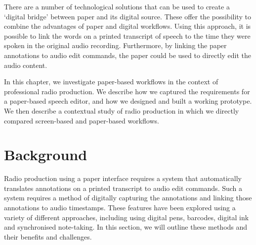 There are a number of technological solutions that can be used to create a `digital bridge' between paper and
its digital source. These offer the possibility to combine the advantages of paper and digital workflows. Using this
approach, it is possible to link the words on a printed transcript of speech to the time they were spoken in the
original audio recording. Furthermore, by linking the paper annotations to audio edit commands, the paper could be used
to directly edit the audio content.

In this chapter, we investigate paper-based workflows in the context of professional radio production. We describe how
we captured the requirements for a paper-based speech editor, and how we designed and built a working prototype. We
then describe a contextual study of radio production in which we directly compared screen-based and paper-based
workflows. 

\section{Background}\label{sec:paper-background}
Radio production using a paper interface requires a system that automatically translates annotations on a printed
transcript to audio edit commands. Such a system requires a method of digitally capturing the annotations and linking
those annotations to audio timestamps.
These features have been explored using a variety of different approaches,
including using digital pens, barcodes, digital ink and synchronised note-taking. In this section, we will outline
these methods and their benefits and challenges.


